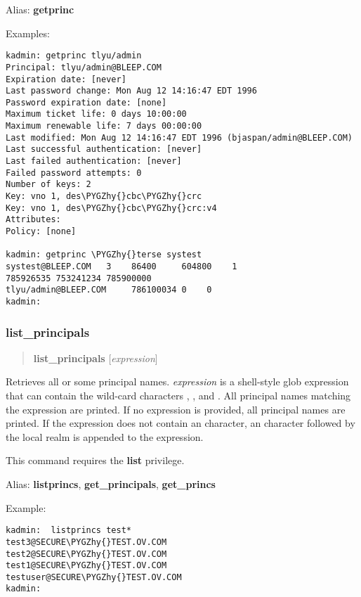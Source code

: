 \documentclass[letterpaper,10pt,english]{sphinxmanual}
\def\PYGZhy{\char`\-}
\begin{document}
Alias: \textbf{getprinc}

Examples:

\begin{Verbatim}[commandchars=\\\{\}]
kadmin: getprinc tlyu/admin
Principal: tlyu/admin@BLEEP.COM
Expiration date: [never]
Last password change: Mon Aug 12 14:16:47 EDT 1996
Password expiration date: [none]
Maximum ticket life: 0 days 10:00:00
Maximum renewable life: 7 days 00:00:00
Last modified: Mon Aug 12 14:16:47 EDT 1996 (bjaspan/admin@BLEEP.COM)
Last successful authentication: [never]
Last failed authentication: [never]
Failed password attempts: 0
Number of keys: 2
Key: vno 1, des\PYGZhy{}cbc\PYGZhy{}crc
Key: vno 1, des\PYGZhy{}cbc\PYGZhy{}crc:v4
Attributes:
Policy: [none]

kadmin: getprinc \PYGZhy{}terse systest
systest@BLEEP.COM   3    86400     604800    1
785926535 753241234 785900000
tlyu/admin@BLEEP.COM     786100034 0    0
kadmin:
\end{Verbatim}
\label{admin/admin_commands/kadmin_local:get-principal-end}

\subsubsection{list\_principals}
\label{admin/admin_commands/kadmin_local:get-principal-end}\label{admin/admin_commands/kadmin_local:id8}\label{admin/admin_commands/kadmin_local:list-principals}\begin{quote}

\textbf{list\_principals} {[}\emph{expression}{]}
\end{quote}

Retrieves all or some principal names.  \emph{expression} is a shell-style
glob expression that can contain the wild-card characters ,
\code{*}, and \code{{[}{]}}.  All principal names matching the expression are
printed.  If no expression is provided, all principal names are
printed.  If the expression does not contain an  character, an
 character followed by the local realm is appended to the
expression.

This command requires the \textbf{list} privilege.

Alias: \textbf{listprincs}, \textbf{get\_principals}, \textbf{get\_princs}

Example:

\begin{Verbatim}[commandchars=\\\{\}]
kadmin:  listprincs test*
test3@SECURE\PYGZhy{}TEST.OV.COM
test2@SECURE\PYGZhy{}TEST.OV.COM
test1@SECURE\PYGZhy{}TEST.OV.COM
testuser@SECURE\PYGZhy{}TEST.OV.COM
kadmin:
\end{Verbatim}
\label{admin/admin_commands/kadmin_local:list-principals-end}
\end{document}
